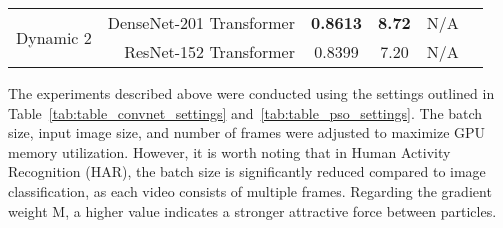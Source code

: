 \documentclass[fleqn,10pt]{wlscirep}
\begin{document}
\begin{table}[!htb]
\begin{tabular}{|c|r|c|c|c|c|}
\cline{1-5}
\multirow{2}{*}{Dynamic 2}           & DenseNet-201 Transformer & \textbf{0.8613} & \textbf{8.72} & N/A                 &                       \\ 
\cline{2-5}
                                     & ResNet-152 Transformer   & 0.8399          & 7.20          & N/A                 &                       \\
\hline
\end{tabular}
\end{table} The experiments described above were conducted using the settings outlined in Table~\ref{tab:table_convnet_settings} and~\ref{tab:table_pso_settings}. The batch size, input image size, and number of frames were adjusted to maximize GPU memory utilization. However, it is worth noting that in Human Activity Recognition (HAR), the batch size is significantly reduced compared to image classification, as each video consists of multiple frames. Regarding the gradient weight M, a higher value indicates a stronger attractive force between particles.\\
\end{document}
